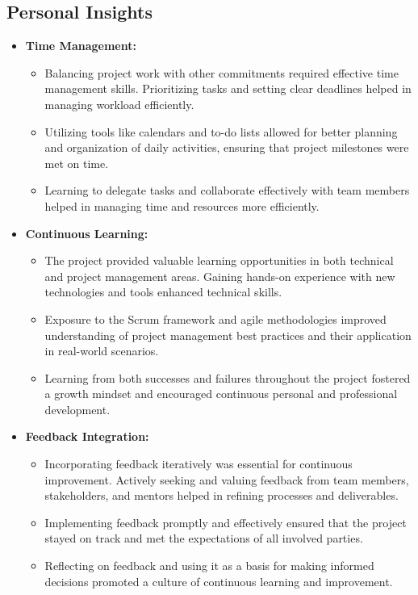 \documentclass[11pt,a4paper]{article}
\begin{document}
    \subsection{Personal Insights}\label{subsec:personal-insights}
    \begin{itemize}
        \item \textbf{Time Management:}
        \begin{itemize}
            \item Balancing project work with other commitments required effective time management skills. Prioritizing tasks and setting clear deadlines helped in managing workload efficiently.
            \item Utilizing tools like calendars and to-do lists allowed for better planning and organization of daily activities, ensuring that project milestones were met on time.
            \item Learning to delegate tasks and collaborate effectively with team members helped in managing time and resources more efficiently.
        \end{itemize}

        \item \textbf{Continuous Learning:}
        \begin{itemize}
            \item The project provided valuable learning opportunities in both technical and project management areas. Gaining hands-on experience with new technologies and tools enhanced technical skills.
            \item Exposure to the Scrum framework and agile methodologies improved understanding of project management best practices and their application in real-world scenarios.
            \item Learning from both successes and failures throughout the project fostered a growth mindset and encouraged continuous personal and professional development.
        \end{itemize}

        \item \textbf{Feedback Integration:}
        \begin{itemize}
            \item Incorporating feedback iteratively was essential for continuous improvement. Actively seeking and valuing feedback from team members, stakeholders, and mentors helped in refining processes and deliverables.
            \item Implementing feedback promptly and effectively ensured that the project stayed on track and met the expectations of all involved parties.
            \item Reflecting on feedback and using it as a basis for making informed decisions promoted a culture of continuous learning and improvement.
        \end{itemize}


\end{itemize}
\end{document}

